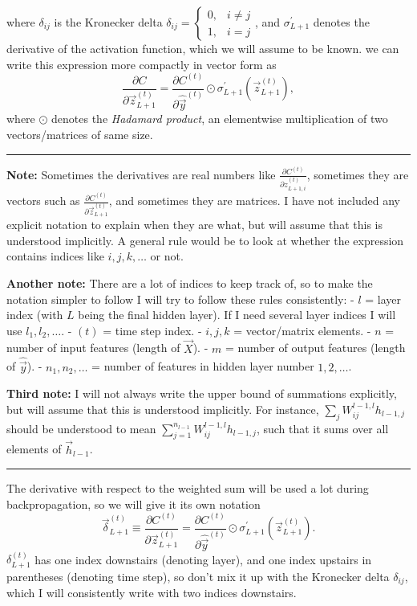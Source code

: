 \documentclass[11pt]{article}
\begin{document}
where \(\delta_{ij}\) is the Kronecker delta
\(\delta_{ij} = \begin{cases}
0, & i \neq j\\
1, & i = j
\end{cases}\), and \(\sigma_{L+1}^\prime\) denotes the derivative of the
activation function, which we will assume to be known. we can write this
expression more compactly in vector form as \[
\frac{\partial C}{\partial \vec{z}_{L+1}^{(t)}} = \frac{\partial C^{(t)}}{\partial \hat{\vec{y}}^{(t)}} \odot \sigma_{L+1}^\prime \left( \vec{z}_{L+1}^{(t)} \right),
\] where \(\odot\) denotes the \emph{Hadamard product}, an elementwise
multiplication of two vectors/matrices of same size.

    \begin{center}\rule{0.5\linewidth}{0.5pt}\end{center}

\textbf{Note:} Sometimes the derivatives are real numbers like
\(\frac{\partial C^{(t)}}{\partial z_{L+1,i}^{(t)}}\), sometimes they
are vectors such as
\(\frac{\partial C^{(t)}}{\partial \vec{z}_{L+1}^{(t)}}\), and sometimes
they are matrices. I have not included any explicit notation to explain
when they are what, but will assume that this is understood implicitly.
A general rule would be to look at whether the expression contains
indices like \(i,j,k,\ldots\) or not.

\textbf{Another note:} There are a lot of indices to keep track of, so
to make the notation simpler to follow I will try to follow these rules
consistently: - \(l\) = layer index (with \(L\) being the final hidden
layer). If I need several layer indices I will use \(l_1,l_2,\ldots\). -
\((t)\) = time step index. - \(i,j,k\) = vector/matrix elements. - \(n\)
= number of input features (length of \(\vec{X}\)). - \(m\) = number of
output features (length of \(\hat{\vec{y}}\)). - \(n_1,n_2,\ldots\) =
number of features in hidden layer number \(1,2,\ldots\).

\textbf{Third note:} I will not always write the upper bound of
summations explicitly, but will assume that this is understood
implicitly. For instance, \(\sum_j W^{l-1,l}_{ij} h_{l-1,j}\) should be
understood to mean \(\sum_{j=1}^{n_{l-1}} W^{l-1,l}_{ij} h_{l-1,j}\),
such that it sums over all elements of \(\vec{h}_{l-1}\).

\begin{center}\rule{0.5\linewidth}{0.5pt}\end{center}

    The derivative with respect to the weighted sum will be used a lot
during backpropagation, so we will give it its own notation
\[ \vec{\delta}_{L+1}^{(t)} \equiv \frac{\partial C^{(t)}}{\partial \vec{z}_{L+1}^{(t)}} = \frac{\partial C^{(t)}}{\partial \hat{\vec{y}}^{(t)}} \odot \sigma_{L+1}^\prime \left( \vec{z}_{L+1}^{(t)} \right).\]
\(\delta_{L+1}^{(t)}\) has one index downstairs (denoting layer), and
one index upstairs in parentheses (denoting time step), so don't mix it
up with the Kronecker delta \(\delta_{ij}\), which I will consistently
write with two indices downstairs.
\end{document}
